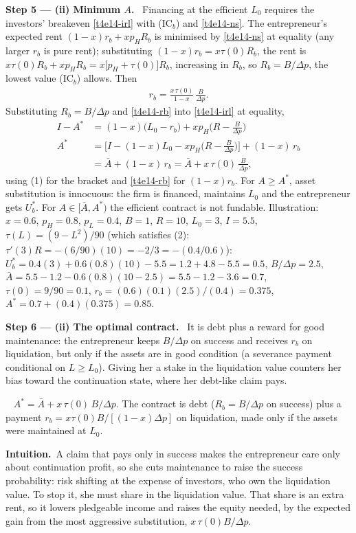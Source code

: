 \documentclass[11pt,a4paper]{article}
\newcommand{\step}[2]{\par\medskip\noindent\textbf{Step #1 --- #2.}~}
\newcommand{\intuition}{\par\medskip\noindent\textbf{Intuition.}~}
\newcommand{\answer}[1]{\par\smallskip\noindent\fbox{\textbf{Answer #1.}}~}
\begin{document}
\step{5}{(ii) Minimum $A$} Financing at the efficient $L_0$ requires the investors' breakeven
\eqref{t4e14-irl} with (IC$_b$) and \eqref{t4e14-ns}. The entrepreneur's expected rent
$(1-x)r_b+xp_HR_b$ is minimised by \eqref{t4e14-ns} at equality (any larger $r_b$ is pure rent);
substituting $(1-x)r_b=x\tau(0)R_b$, the rent is $x\tau(0)R_b+xp_HR_b=x\big[p_H+\tau(0)\big]R_b$,
increasing in $R_b$, so $R_b=B/\Delta p$, the lowest value (IC$_b$) allows. Then
\begin{align}
  r_b=\frac{x\,\tau(0)}{1-x}\,\frac{B}{\Delta p}. \label{t4e14-rb}
\end{align}
Substituting $R_b=B/\Delta p$ and \eqref{t4e14-rb} into \eqref{t4e14-irl} at equality,
\begin{align}
  I-A^* &= (1-x)\big(L_0-r_b\big)+xp_H\Big(R-\frac{B}{\Delta p}\Big) \nonumber\\
  A^* &= \Big[I-(1-x)L_0-xp_H\Big(R-\frac{B}{\Delta p}\Big)\Big]+(1-x)\,r_b \nonumber\\
      &= \bar A+(1-x)\,r_b=\bar A+x\,\tau(0)\,\frac{B}{\Delta p}, \label{t4e14-Astar}
\end{align}
using (1) for the bracket and \eqref{t4e14-rb} for $(1-x)r_b$.
For $A\ge A^*$, asset substitution is innocuous: the firm is financed, maintains $L_0$ and the
entrepreneur gets $U_b^*$. For $A\in[\bar A,A^*)$ the efficient contract is not fundable. Illustration:
$x=0.6$, $p_H=0.8$, $p_L=0.4$, $B=1$, $R=10$, $L_0=3$, $I=5.5$, $\tau(L)=(9-L^2)/90$ (which satisfies
(2): $\tau'(3)R=-(6/90)(10)=-2/3=-(0.4/0.6)$): $U_b^*=0.4(3)+0.6(0.8)(10)-5.5=1.2+4.8-5.5=0.5$,
$B/\Delta p=2.5$, $\bar A=5.5-1.2-0.6(0.8)(10-2.5)=5.5-1.2-3.6=0.7$, $\tau(0)=9/90=0.1$,
$r_b=(0.6)(0.1)(2.5)/(0.4)=0.375$, $A^*=0.7+(0.4)(0.375)=0.85$.

\step{6}{(ii) The optimal contract} It is debt plus a reward for good maintenance: the entrepreneur
keeps $B/\Delta p$ on success and receives $r_b$ on liquidation, but only if the assets are in good
condition (a severance payment conditional on $L\ge L_0$). Giving her a stake in the liquidation
value counters her bias toward the continuation state, where her debt-like claim pays.

\answer{(ii), minimum $A$ and contract} $A^*=\bar A+x\,\tau(0)\,B/\Delta p$. The contract is debt
($R_b=B/\Delta p$ on success) plus a payment $r_b=x\tau(0)B/[(1-x)\Delta p]$ on liquidation, made only if
the assets were maintained at $L_0$.

\intuition A claim that pays only in success makes the entrepreneur care only about continuation
profit, so she cuts maintenance to raise the success probability: risk shifting at the expense of
investors, who own the liquidation value. To stop it, she must share in the liquidation value. That
share is an extra rent, so it lowers pledgeable income and raises the equity needed, by the expected
gain from the most aggressive substitution, $x\,\tau(0)B/\Delta p$.
\end{document}
